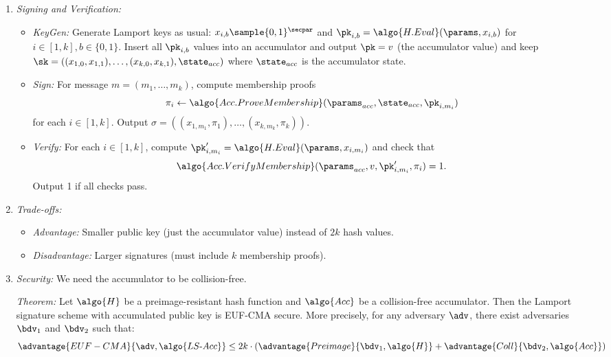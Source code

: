 \ifsolutions
\begin{mysolution}
  \begin{enumerate}
    \item \emph{Signing and Verification:}
    \begin{itemize}
      \item \emph{KeyGen:} Generate Lamport keys as usual: $x_{i,b} \sample \{0,1\}^\secpar$ and $\pk_{i,b} = \algo{H.Eval}(\params, x_{i,b})$ for $i \in [1,k], b \in \{0,1\}$.
      Insert all $\pk_{i,b}$ values into an accumulator and output $\pk = v$ (the accumulator value) and keep $\sk = ((x_{1,0}, x_{1,1}), \ldots, (x_{k,0}, x_{k,1}), \state_{acc})$ where $\state_{acc}$ is the accumulator state.
    \item \emph{Sign:} For message $m = (m_1, \ldots, m_k)$, compute membership proofs
      \[
        \pi_i \gets \algo{Acc.ProveMembership}(\params_{acc}, \state_{acc}, \pk_{i,m_i})
      \]
      for each $i \in [1,k]$.
      Output $\sigma = ((x_{1,m_1}, \pi_1), \ldots, (x_{k,m_k}, \pi_k))$.
    \item \emph{Verify:} For each $i \in [1,k]$, compute $\pk'_{i,m_i} = \algo{H.Eval}(\params, x_{i,m_i})$ and check that
      \[
      \algo{Acc.VerifyMembership}(\params_{acc}, v, \pk'_{i,m_i}, \pi_i) = 1.
      \]
      Output 1 if all checks pass.
    \end{itemize}
    
    \item \emph{Trade-offs:}
    \begin{itemize}
      \item \emph{Advantage:} Smaller public key (just the accumulator value) instead of $2k$ hash values.
      \item \emph{Disadvantage:} Larger signatures (must include $k$ membership proofs).
    \end{itemize}
    
    \item \emph{Security:}
    We need the accumulator to be collision-free.
    
    \emph{Theorem:} Let $\algo{H}$ be a preimage-resistant hash function and $\algo{Acc}$ be a collision-free accumulator.
    Then the Lamport signature scheme with accumulated public key is EUF-CMA secure.
    More precisely, for any \ppt adversary $\adv$, there exist \ppt adversaries $\bdv_1$ and $\bdv_2$ such that:
    \[
      \advantage{EUF-CMA}{\adv, \algo{LS\text{-}Acc}} \leq 2k \cdot (\advantage{Preimage}{\bdv_1, \algo{H}} + \advantage{Coll}{\bdv_2, \algo{Acc}})
    \]
    

\end{enumerate}
\end{mysolution}
